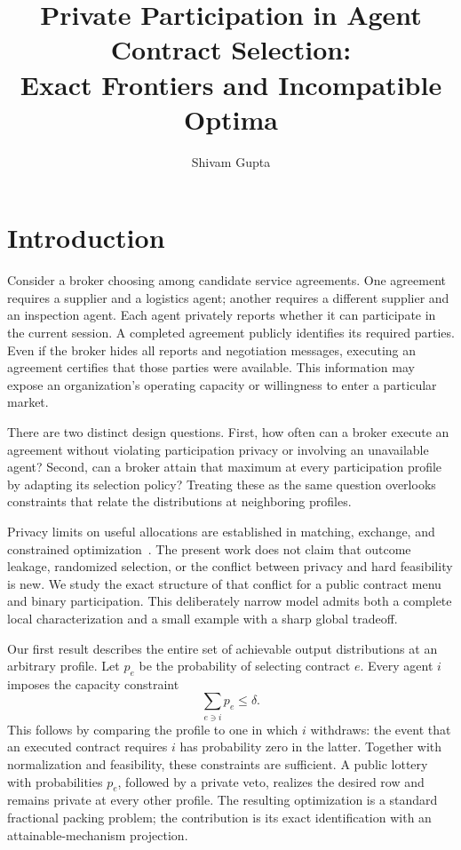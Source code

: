 \documentclass[sigconf,nonacm]{aamas}
\title[Private Participation in Agent Contract Selection]{Private Participation in Agent Contract Selection:\texorpdfstring{\\}{ }Exact Frontiers and Incompatible Optima}
\author{Shivam Gupta}
\affiliation{\institution{Independent Researcher}\city{Delhi}\country{India}}
\begin{document}
\maketitle
{}

\section{Introduction}
Consider a broker choosing among candidate service agreements. One agreement requires a supplier and a logistics agent; another requires a different supplier and an inspection agent. Each agent privately reports whether it can participate in the current session. A completed agreement publicly identifies its required parties. Even if the broker hides all reports and negotiation messages, executing an agreement certifies that those parties were available. This information may expose an organization's operating capacity or willingness to enter a particular market.

There are two distinct design questions. First, how often can a broker execute an agreement without violating participation privacy or involving an unavailable agent? Second, can a broker attain that maximum at every participation profile by adapting its selection policy? Treating these as the same question overlooks constraints that relate the distributions at neighboring profiles.

Privacy limits on useful allocations are established in matching, exchange, and constrained optimization~\cite{hsu2016,kannan2018,munoz2021}. The present work does not claim that outcome leakage, randomized selection, or the conflict between privacy and hard feasibility is new. We study the exact structure of that conflict for a public contract menu and binary participation. This deliberately narrow model admits both a complete local characterization and a small example with a sharp global tradeoff.

Our first result describes the entire set of achievable output distributions at an arbitrary profile. Let $p_e$ be the probability of selecting contract $e$. Every agent $i$ imposes the capacity constraint
\begin{equation}\label{eq:load-intro}
\sum_{e\ni i}p_e\leq\delta.
\end{equation}
This follows by comparing the profile to one in which $i$ withdraws: the event that an executed contract requires $i$ has probability zero in the latter. Together with normalization and feasibility, these constraints are sufficient. A public lottery with probabilities $p_e$, followed by a private veto, realizes the desired row and remains private at every other profile. The resulting optimization is a standard fractional packing problem; the contribution is its exact identification with an attainable-mechanism projection.
\end{document}
